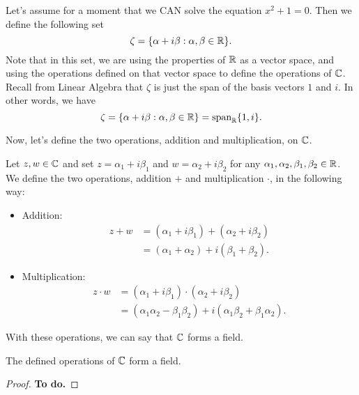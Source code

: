 \documentclass[a4paper]{report}
\begin{document}
Let's assume for a moment that we CAN solve the equation \( x^{2} + 1 = 0   \). Then we define the following set
\[  \zeta = \{ \alpha + i \beta : \alpha, \beta \in \mathbb{R}  \}.   \]
Note that in this set, we are using the properties of \( \mathbb{R}  \) as a vector space, and using the operations defined on that vector space to define the operations of \( \C  \). Recall from Linear Algebra that \( \zeta  \) is just the span of the basis vectors \( 1  \) and \( i  \). In other words, we have
\[ \zeta = \{ \alpha + i \beta : \alpha , \beta \in \mathbb{R}  \} = \text{span}_{\mathbb{R}} \{ 1, i \}.     \]

Now, let's define the two operations, addition and multiplication, on \( \C  \).

\begin{definition}[Operations on \( \C  \)]
    Let \( z,w \in \mathbb{C}  \) and set \( z = {\alpha}_{1} + i {\beta}_{1} \) and \( w = {\alpha}_{2} + i {\beta}_{2} \) for any \( {\alpha}_{1}, {\alpha}_{2}, {\beta}_{1}, {\beta}_{2} \in \mathbb{R}  \). We define the two operations, addition \( +  \) and multiplication \( \cdot \), in the following way:    
    \begin{itemize}
        \item Addition:  
            \begin{align*}
                z + w &= ({\alpha}_{1} + i {\beta}_{1}) + ({\alpha}_{2} + i {\beta}_{2}) \\
                      &= ({\alpha}_{1} + {\alpha}_{2}) + i ({\beta}_{1} + {\beta}_{2}).
            \end{align*}
        \item Multiplication:
            \begin{align*}
                z \cdot w &= ({\alpha}_{1} + i {\beta}_{1}) \cdot ({\alpha}_{2} + i {\beta}_{2})  \\
                          &= ({\alpha}_{1} {\alpha}_{2} - {\beta}_{1} {\beta}_{2}) + i ({\alpha}_{1} {\beta}_{2} + {\beta}_{1} {\alpha}_{2}).
            \end{align*}
    \end{itemize}
\end{definition}

With these operations, we can say that \( \C  \) forms a field.

\begin{prop}
   The defined operations of \( \C  \) form a field.
\end{prop}
\begin{proof}
\textbf{To do.}
\end{proof}
\end{document}
